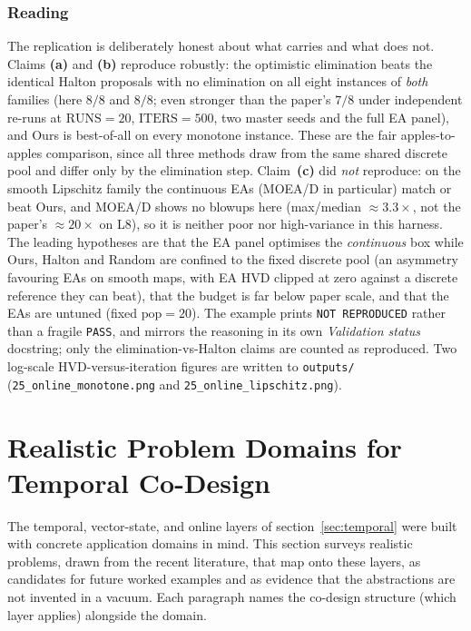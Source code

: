 \documentclass[11pt,a4paper]{article}
\begin{document}
\subsubsection*{Reading}
The replication is deliberately honest about what carries and what does
not. Claims \textbf{(a)} and \textbf{(b)} reproduce robustly: the
optimistic elimination beats the identical Halton proposals with no
elimination on all eight instances of \emph{both} families (here $8/8$ and
$8/8$; even stronger than the paper's $7/8$ under independent re-runs at
$\mathrm{RUNS}{=}20$, $\mathrm{ITERS}{=}500$, two master seeds and the full
EA panel), and Ours is best-of-all on every monotone instance. These are
the fair apples-to-apples comparison, since all three methods draw from the
same shared discrete pool and differ only by the elimination step.
Claim~\textbf{(c)} did \emph{not} reproduce: on the smooth Lipschitz family
the continuous EAs (MOEA/D in particular) match or beat Ours, and MOEA/D
shows no blowups here (max/median $\approx 3.3\times$, not the paper's
$\approx 20\times$ on L8), so it is neither poor nor high-variance in this
harness. The leading hypotheses are that the EA panel optimises the
\emph{continuous} box while Ours, Halton and Random are confined to the
fixed discrete pool (an asymmetry favouring EAs on smooth maps, with EA HVD
clipped at zero against a discrete reference they can beat), that the budget
is far below paper scale, and that the EAs are untuned (fixed
$\text{pop}=20$). The example prints \texttt{NOT REPRODUCED} rather than a
fragile \texttt{PASS}, and mirrors the reasoning in its own
\emph{Validation status} docstring; only the elimination-vs-Halton claims
are counted as reproduced. Two log-scale HVD-versus-iteration figures are
written to \texttt{outputs/} (\texttt{25\_online\_monotone.png} and
\texttt{25\_online\_lipschitz.png}).

\section{Realistic Problem Domains for Temporal Co-Design}
\label{sec:domains}

The temporal, vector-state, and online layers of
section~\ref{sec:temporal} were built with concrete application domains in
mind. This section surveys realistic problems, drawn from the recent
literature, that map onto these layers, as candidates for future worked
examples and as evidence that the abstractions are not invented in a
vacuum. Each paragraph names the co-design structure (which layer applies)
alongside the domain.
\end{document}
